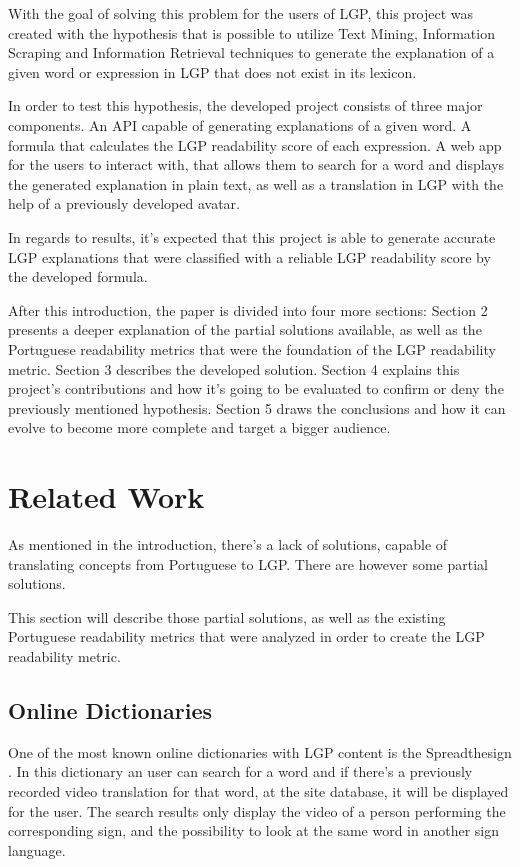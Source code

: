 \documentclass[runningheads]{llncs}
\begin{document}
With the goal of solving this problem for the users of LGP, this project was created with the hypothesis that is possible to utilize Text Mining\cite{textmining}, Information Scraping\cite{scrapingInfo}\cite{autoScraping} and Information Retrieval\cite{infoRet} techniques to generate the explanation of a given word or expression in LGP that does not exist in its lexicon.

In order to test this hypothesis, the developed project consists of three major components.
An API capable of generating explanations of a given word.
A formula that calculates the LGP readability score of each expression.
A web app for the users to interact with, that allows them to search for a word and displays the generated explanation in plain text, as well as a translation in LGP with the help of a previously developed avatar.

In regards to results, it's expected that this project is able to generate accurate LGP explanations that were classified with a reliable LGP readability score by the developed formula.

After this introduction, the paper is divided into four more sections:
Section 2 presents a deeper explanation of the partial solutions available, as well as the Portuguese readability metrics that were the foundation of the LGP readability metric.
Section 3 describes the developed solution.
Section 4 explains this project's contributions and how it's going to be evaluated to confirm or deny the previously mentioned hypothesis.
Section 5 draws the conclusions and how it can evolve to become more complete and target a bigger audience.

\section{Related Work}

As mentioned in the introduction, there's a lack of solutions, capable of translating concepts from Portuguese to LGP.
There are however some partial solutions.

This section will describe those partial solutions, as well as the existing Portuguese readability metrics that were analyzed in order to create the LGP readability metric.

\subsection{Online Dictionaries}

One of the most known online dictionaries with LGP content is the Spreadthesign \cite{sts_2020}.
In this dictionary an user can search for a word and if there's a previously recorded video translation for that word, at the site database, it will be displayed for the user.
The search results only display the video of a person performing the corresponding sign, and the possibility to look at the same word in another sign language.
\end{document}
